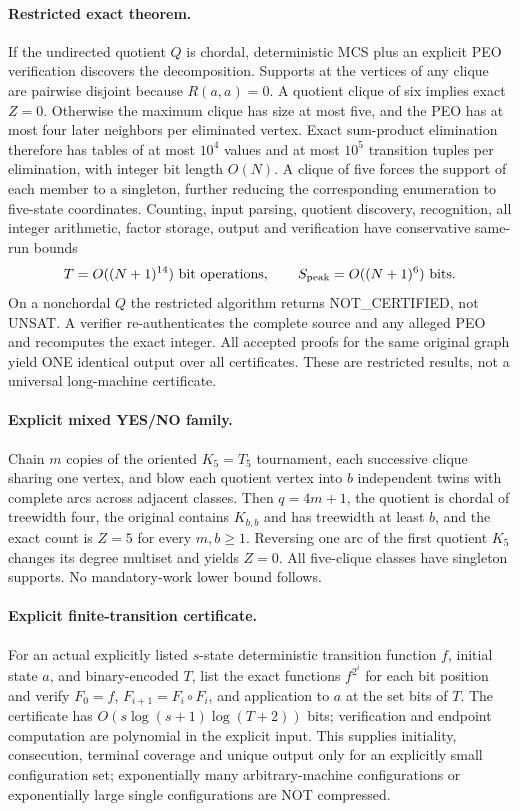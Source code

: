 \documentclass[11pt]{article}
\begin{document}
\paragraph{Restricted exact theorem.} If the undirected quotient $Q$ is chordal, deterministic MCS plus an explicit PEO verification discovers the decomposition. Supports at the vertices of any clique are pairwise disjoint because $R(a,a)=0$. A quotient clique of six implies exact $Z=0$. Otherwise the maximum clique has size at most five, and the PEO has at most four later neighbors per eliminated vertex. Exact sum-product elimination therefore has tables of at most $10^4$ values and at most $10^5$ transition tuples per elimination, with integer bit length $O(N)$. A clique of five forces the support of each member to a singleton, further reducing the corresponding enumeration to five-state coordinates. Counting, input parsing, quotient discovery, recognition, all integer arithmetic, factor storage, output and verification have conservative same-run bounds
\[
T=O((N+1)^{14})\text{ bit operations},\qquad
S_{\rm peak}=O((N+1)^6)\text{ bits}.
\]
On a nonchordal $Q$ the restricted algorithm returns NOT\_CERTIFIED, not UNSAT. A verifier re-authenticates the complete source and any alleged PEO and recomputes the exact integer. All accepted proofs for the same original graph yield ONE identical output over all certificates. These are restricted results, not a universal long-machine certificate.
\paragraph{Explicit mixed YES/NO family.} Chain $m$ copies of the oriented $K_5=T_5$ tournament, each successive clique sharing one vertex, and blow each quotient vertex into $b$ independent twins with complete arcs across adjacent classes. Then $q=4m+1$, the quotient is chordal of treewidth four, the original contains $K_{b,b}$ and has treewidth at least $b$, and the exact count is $Z=5$ for every $m,b\ge1$. Reversing one arc of the first quotient $K_5$ changes its degree multiset and yields $Z=0$. All five-clique classes have singleton supports. No mandatory-work lower bound follows.
\paragraph{Explicit finite-transition certificate.} For an actual explicitly listed $s$-state deterministic transition function $f$, initial state $a$, and binary-encoded $T$, list the exact functions $f^{2^i}$ for each bit position and verify $F_0=f$, $F_{i+1}=F_i\circ F_i$, and application to $a$ at the set bits of $T$. The certificate has $O(s\log(s+1)\log(T+2))$ bits; verification and endpoint computation are polynomial in the explicit input. This supplies initiality, consecution, terminal coverage and unique output only for an explicitly small configuration set; exponentially many arbitrary-machine configurations or exponentially large single configurations are NOT compressed.
\end{document}
